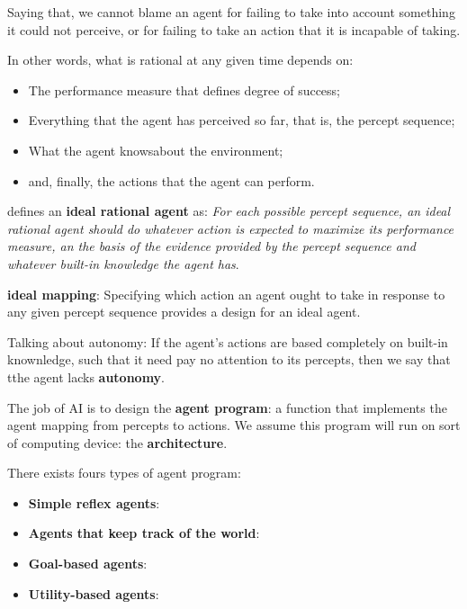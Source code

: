         Saying that, we cannot blame an agent for failing to take into account something it could not perceive, or for failing to take an action that it is incapable of taking.
        
        In other words, what is rational at any given time depends on:
        \begin{itemize}
            \item The performance measure that defines degree of success;
            \item Everything that the agent has perceived so far, that is, the percept sequence;
            \item What the agent knowsabout the environment;
            \item and, finally, the actions that the agent can perform.
        \end{itemize}
        
        \cite{ref:russell1995aima} defines an \textbf{ideal rational agent} as: \textit{For each possible percept sequence, an ideal rational agent should do whatever action is expected to maximize its performance measure, an the basis of the evidence provided by the percept sequence and whatever built-in knowledge the agent has}.
        
        \textbf{ideal mapping}: Specifying which action an agent ought to take in response to any given percept sequence provides a design for an ideal agent.
        
        Talking about autonomy: If the agent's actions are based completely on built-in knownledge, such that it need pay no attention to its percepts, then we say that tthe agent lacks \textbf{autonomy}.
        
        The job of AI is to design the \textbf{agent program}: a function that implements the agent mapping from percepts to actions. We assume this program will run on sort of computing device: the \textbf{architecture}.
        
        There exists fours types of agent program:
        \begin{itemize}
            \item \textbf{Simple reflex agents}:
            \item \textbf{Agents that keep track of the world}:
            \item \textbf{Goal-based agents}:
            \item \textbf{Utility-based agents}:
        \end{itemize}
        
